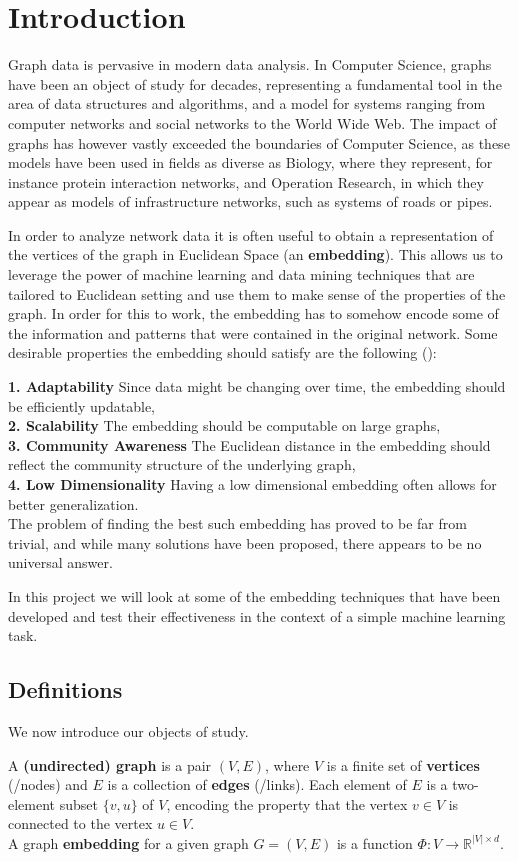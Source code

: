 \section{Introduction}
Graph data is pervasive in modern data analysis. In Computer Science, graphs have been an object of study for decades, representing a fundamental tool in the area of data structures and algorithms, and a model for systems ranging from computer networks and social networks to the World Wide Web. The impact of graphs has however vastly exceeded the boundaries of Computer Science, as these models have been used in fields as diverse as Biology, where they represent, for instance protein interaction networks, and Operation Research, in which they appear as models of infrastructure networks, such as systems of roads or pipes.

In order to analyze network data it is often useful to obtain a representation of the vertices of the graph in Euclidean Space (an \textbf{embedding}). This allows us to leverage the power of machine learning and data mining techniques that are tailored to Euclidean setting and use them to make sense of the properties of the graph. In order for this to work, the embedding has to somehow encode some of the information and patterns that were contained in the original network. Some desirable properties the embedding should satisfy are the following (\cite{chen2018tutorial}):

\textbf{1. Adaptability} Since data might be changing over time, the embedding should be efficiently updatable,\\
\textbf{2. Scalability} The embedding should be computable on large graphs,\\
\textbf{3. Community Awareness} The Euclidean distance in the embedding should reflect the community structure of the underlying graph,\\
\textbf{4. Low Dimensionality} Having a low dimensional embedding often allows for better generalization.\\


The problem of finding the best such embedding has proved to be far from trivial, and while many solutions have been proposed, there appears to be no universal answer.

In this project we will look at some of the embedding techniques that have been developed and test their effectiveness in the context of a simple machine learning task.


\subsection{Definitions}
We now introduce our objects of study.

A \textbf{(undirected) graph} is a pair $(V,E)$, where $V$ is a finite set of \textbf{vertices} (/nodes) and $E$ is a collection of \textbf{edges} (/links). Each element of $E$ is a two-element subset $\{v,u\}$ of $V$, encoding the property that the vertex $v \in V$ is connected to the vertex $u \in V$.\\

A graph \textbf{embedding} for a given graph $G = (V,E)$ is a function $\Phi:V \to \mathbb{R}^{|V| \times d}$.
